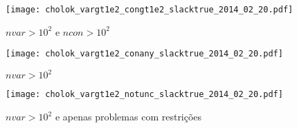 \documentclass{article}
\begin{document}
\begin{figure}[H]
\centering
\texttt{[image: cholok\_vargt1e2\_congt1e2\_slacktrue\_2014\_02\_20.pdf]}
\caption{ $nvar > 10^2$ e $ncon > 10^2$ }
\label{fig:both_medium_and_big}
\end{figure}

\begin{figure}[H]
\centering
\texttt{[image: cholok\_vargt1e2\_conany\_slacktrue\_2014\_02\_20.pdf]}
\caption{ $nvar > 10^2$ }
\label{fig:nvar_medium_and_big}
\end{figure}

\begin{figure}[H]
\centering
\texttt{[image: cholok\_vargt1e2\_notunc\_slacktrue\_2014\_02\_20.pdf]}
\caption{ $nvar > 10^2$ e apenas problemas com restrições }
\label{fig:nvar_medium_and_big_not_unc}
\end{figure}
\end{document}
